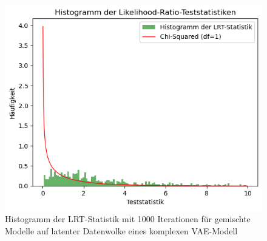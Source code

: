 \documentclass[%
thesis=student,%
coverpage=false,%
titlepage=false,%
headmarks=true, %
german,%
font=libertine, %
math=newpxtx, %
BCOR=5mm,%
coverBCOR=11mm%
]{tumbook}
\theoremstyle{break}
\begin{document}
\\
\begin{figure}[h]
	\centering
	\includegraphics[scale=0.5]{plots/4_latent_dim_VAE.png}
	\caption{Histogramm der LRT-Statistik mit 1000 Iterationen für gemischte Modelle auf latenter Datenwolke eines komplexen VAE-Modell}
	\label{fig:HIST_4latentdim}
\end{figure}
\end{document}
